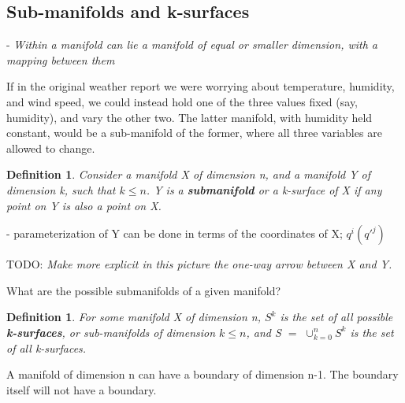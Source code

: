 \documentclass{book}
\newtheorem{defn}[equation]{Definition}
\begin{document}
\subsection{Sub-manifolds and k-surfaces}

- \emph{Within a manifold can lie a manifold of equal or smaller dimension, with a mapping between them}

If in the original weather report we were worrying about temperature, humidity, and wind speed, we could instead hold one of the three values fixed (say, humidity), and vary the other two. The latter manifold, with humidity held constant, would be a sub-manifold of the former, where all three variables are allowed to change.  



\begin{defn}
	Consider a manifold X of dimension n, and a manifold Y of dimension k, such that $k \leq n$. Y is a \textbf{submanifold} or a k-surface of X if any point on Y is also a point on X. 
\end{defn}

- parameterization of Y can be done in terms of the coordinates of X; $q^i(q'^j)$



TODO: \emph{Make more explicit in this picture the one-way arrow between X and Y.}


What are the possible submanifolds of a given manifold?


\begin{defn}
	For some manifold X of dimension n, $S^k$ is the set of all possible \textbf{k-surfaces}, or sub-manifolds of dimension $k \leq n$, and S $=$ $\cup^n_{k=0}S^k$ is the set of all k-surfaces. 
\end{defn}

A manifold of dimension n can have a boundary of dimension n-1. The boundary itself will not have a boundary.
\end{document}
